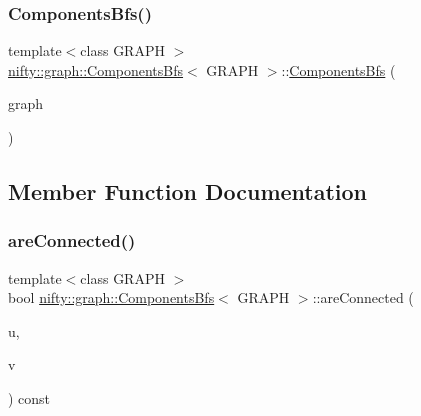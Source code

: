 \subsubsection{\texorpdfstring{Components\+Bfs()}{ComponentsBfs()}}
{\footnotesize\ttfamily template$<$class G\+R\+A\+PH $>$ \\
\hyperlink{classnifty_1_1graph_1_1ComponentsBfs}{nifty\+::graph\+::\+Components\+Bfs}$<$ G\+R\+A\+PH $>$\+::\hyperlink{classnifty_1_1graph_1_1ComponentsBfs}{Components\+Bfs} (\begin{DoxyParamCaption}\item[{const \hyperlink{classnifty_1_1graph_1_1ComponentsBfs_a8122d3bba657eeae191a63ea83bfaba9}{Graph\+Type} \&}]{graph }\end{DoxyParamCaption})\hspace{0.3cm}{\ttfamily [inline]}}



\subsection{Member Function Documentation}
\mbox{\label{classnifty_1_1graph_1_1ComponentsBfs_a143c2a8363329880698db2a21968df5c}} 
\subsubsection{\texorpdfstring{are\+Connected()}{areConnected()}}
{\footnotesize\ttfamily template$<$class G\+R\+A\+PH $>$ \\
bool \hyperlink{classnifty_1_1graph_1_1ComponentsBfs}{nifty\+::graph\+::\+Components\+Bfs}$<$ G\+R\+A\+PH $>$\+::are\+Connected (\begin{DoxyParamCaption}\item[{const int64\+\_\+t}]{u,  }\item[{const int64\+\_\+t}]{v }\end{DoxyParamCaption}) const\hspace{0.3cm}{\ttfamily [inline]}}

\mbox{\label{classnifty_1_1graph_1_1ComponentsBfs_ac0190ac005f86f02b5e5a32abdfb97c5}} 
